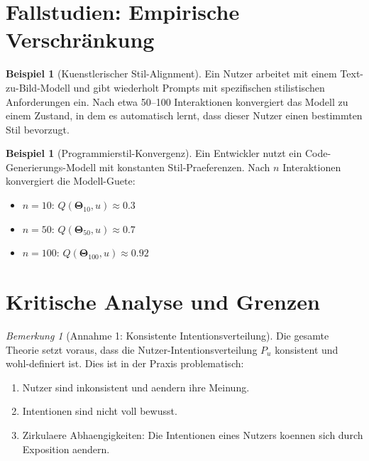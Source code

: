 \documentclass[12pt, a4paper]{article}
\theoremstyle{definition}
\newtheorem{example}[theorem]{Beispiel}
\theoremstyle{remark}
\newtheorem{remark}[theorem]{Bemerkung}
\newcommand{\vTheta}{\bm{\Theta}}
\begin{document}
\section{Fallstudien: Empirische Verschränkung}
\label{sec:fallstudien}

\begin{example}[Kuenstlerischer Stil-Alignment]
\label{ex:artistic_style}
Ein Nutzer arbeitet mit einem Text-zu-Bild-Modell und gibt wiederholt Prompts mit spezifischen stilistischen Anforderungen ein. Nach etwa 50--100 Interaktionen konvergiert das Modell zu einem Zustand, in dem es automatisch lernt, dass dieser Nutzer einen bestimmten Stil bevorzugt.
\end{example}

\begin{example}[Programmierstil-Konvergenz]
\label{ex:code_style}
Ein Entwickler nutzt ein Code-Generierungs-Modell mit konstanten Stil-Praeferenzen. Nach $n$ Interaktionen konvergiert die Modell-Guete:
\begin{itemize}
  \item $n = 10$: $Q(\vTheta_{10}, u) \approx 0.3$
  \item $n = 50$: $Q(\vTheta_{50}, u) \approx 0.7$
  \item $n = 100$: $Q(\vTheta_{100}, u) \approx 0.92$
\end{itemize}
\end{example}

\section{Kritische Analyse und Grenzen}
\label{sec:kritik}

\begin{remark}[Annahme 1: Konsistente Intentionsverteilung]
\label{rem:assumption_consistency}
Die gesamte Theorie setzt voraus, dass die Nutzer-Intentionsverteilung $P_u$ konsistent und wohl-definiert ist. Dies ist in der Praxis problematisch:
\begin{enumerate}[label=(\alph*)]
  \item Nutzer sind inkonsistent und aendern ihre Meinung.
  \item Intentionen sind nicht voll bewusst.
  \item Zirkulaere Abhaengigkeiten: Die Intentionen eines Nutzers koennen sich durch Exposition aendern.
\end{enumerate}
\end{remark}
\end{document}
